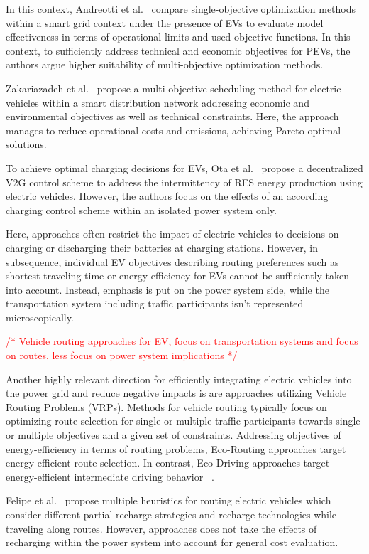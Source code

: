 \documentclass[conference]{IEEEtran}
\newcommand{\todo}[1]{\textcolor{red}{/* #1 */}}
\begin{document}
	In this context, Andreotti et al.~\cite{andreotti2012review} compare single-objective optimization methods within a smart grid context under the presence of EVs to evaluate model effectiveness in terms of operational limits and used objective functions. In this context, to sufficiently address technical and economic objectives for PEVs, the authors argue higher suitability of multi-objective optimization methods. 
	
	Zakariazadeh et al.~\cite{zakariazadeh2014multi} propose a multi-objective scheduling method for electric vehicles within a smart distribution network addressing economic and environmental objectives as well as technical constraints. Here, the approach manages to reduce operational costs and emissions, achieving Pareto-optimal solutions.
	
	To achieve optimal charging decisions for EVs, Ota et al.~\cite{ota2012autonomous} propose a decentralized V2G control scheme to address the intermittency of RES energy production using electric vehicles. However, the authors focus on the effects of an according charging control scheme within an isolated power system only.
	
	Here, approaches often restrict the impact of electric vehicles to decisions on charging or discharging their batteries at charging stations. However, in subsequence, individual EV objectives describing routing preferences such as shortest traveling time or energy-efficiency for EVs cannot be sufficiently taken into account. Instead, emphasis is put on the power system side, while the transportation system including traffic participants isn't represented microscopically. 
	
	\todo{Vehicle routing approaches for EV, focus on transportation systems and focus on routes, less focus on power system implications}
	
	Another highly relevant direction for efficiently integrating electric vehicles into the power grid and reduce negative impacts is are approaches utilizing Vehicle Routing Problems (VRPs). Methods for vehicle routing typically focus on optimizing route selection for single or multiple traffic participants towards single or multiple objectives and a given set of constraints. Addressing objectives of energy-efficiency in terms of routing problems, Eco-Routing approaches target energy-efficient route selection. In contrast, Eco-Driving approaches target energy-efficient intermediate driving behavior ~\cite{ericsson2006optimizing}.
	
	Felipe et al.~\cite{felipe2014heuristic} propose multiple heuristics for routing electric vehicles which consider different partial recharge strategies and recharge technologies while traveling along routes. However, approaches does not take the effects of recharging within the power system into account for general cost evaluation. 
	
\end{document}
